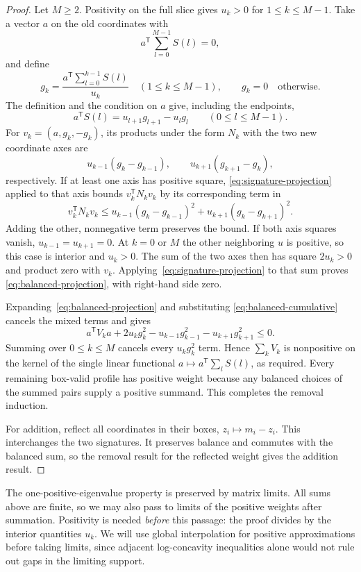 \begin{proof}
Let $M\ge2$.  Positivity on the full slice gives $u_k>0$ for
$1\le k\le M-1$.  Take a vector $a$ on the old coordinates with
\[
 a^{\mathsf T}\sum_{l=0}^{M-1}S(l)=0,
\]
and define
\[
 g_k=\frac{a^{\mathsf T}\sum_{l=0}^{k-1}S(l)}{u_k}
 \quad(1\le k\le M-1),
 \qquad g_k=0\quad\text{otherwise}.
\]
The definition and the condition on $a$ give, including the endpoints,
\begin{equation}
 a^{\mathsf T}S(l)=u_{l+1}g_{l+1}-u_lg_l
 \qquad(0\le l\le M-1).
 \label{eq:balanced-cumulative}
\end{equation}
For $v_k=(a,g_k,-g_k)$, its products under the form $N_k$ with
the two new coordinate axes are
\[
 u_{k-1}(g_k-g_{k-1}),\qquad
 u_{k+1}(g_{k+1}-g_k),
\]
respectively.  If at least one axis has positive square,
\eqref{eq:signature-projection} applied to that axis bounds
$v_k^{\mathsf T}N_kv_k$ by its corresponding term in
\begin{equation}
 v_k^{\mathsf T}N_kv_k
 \le u_{k-1}(g_k-g_{k-1})^2+
      u_{k+1}(g_k-g_{k+1})^2.
 \label{eq:balanced-projection}
\end{equation}
Adding the other, nonnegative term preserves the bound.
If both axis squares vanish, $u_{k-1}=u_{k+1}=0$.
At $k=0$ or $M$ the other neighboring $u$ is positive, so this
case is interior and $u_k>0$.  The sum of the two axes then has
square $2u_k>0$ and product zero with $v_k$.
Applying~\eqref{eq:signature-projection} to that sum proves
\eqref{eq:balanced-projection}, with right-hand side zero.

Expanding~\eqref{eq:balanced-projection} and substituting
\eqref{eq:balanced-cumulative} cancels the mixed terms and gives
\[
 a^{\mathsf T}V_ka+2u_kg_k^2
   -u_{k-1}g_{k-1}^2-u_{k+1}g_{k+1}^2\le0.
\]
Summing over $0\le k\le M$ cancels every $u_kg_k^2$ term.
Hence $\sum_kV_k$ is nonpositive on the kernel of the single
linear functional $a\mapsto a^{\mathsf T}\sum_lS(l)$, as required.
Every remaining box-valid profile has positive weight because any
balanced choices of the summed pairs supply a positive summand.
This completes the removal induction.

For addition, reflect all coordinates in their boxes,
$z_i\mapsto m_i-z_i$.  This interchanges the two signatures.
It preserves balance and commutes with the balanced sum, so the
removal result for the reflected weight gives the addition result.
\end{proof}

The one-positive-eigenvalue property is preserved by matrix limits.
All sums above are finite, so we may also pass to limits of the
positive weights after summation.  Positivity is needed \emph{before}
this passage: the proof divides by the interior quantities $u_k$.
We will use global interpolation for positive approximations before
taking limits, since adjacent log-concavity inequalities alone would
not rule out gaps in the limiting support.

